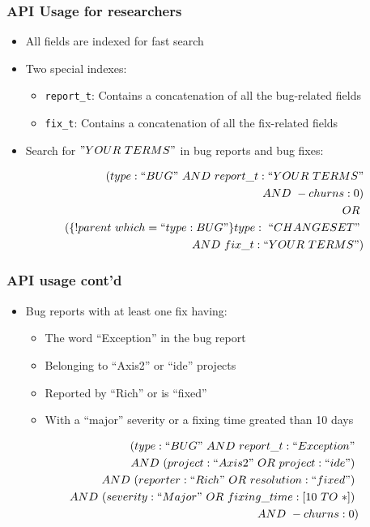 \documentclass{beamer}
\begin{document}
\begin{frame}

  \frametitle{API Usage for researchers}

\begin{itemize}
  \item All fields are indexed for fast search
  \item Two special indexes:
  \begin{itemize}
    \item \texttt{report\_t}: Contains a concatenation of all the bug-related fields
    \item \texttt{fix\_t}: Contains a concatenation of all the fix-related fields
  \end{itemize}
  \item Search for $"YOUR~TERMS"$ in bug reports and bug fixes:
\end{itemize}

  \begin{equation*}
  \begin{split}
  ~~(type:``BUG"~AND~report\_t:``YOUR~TERMS"\\AND~-churns:0)\\
  ~~OR~\\
  ~~(\{!parent~which=``type:BUG"\}type:~``CHANGESET"~\\AND~fix\_t:``YOUR~TERMS")
  \end{split}
  \end{equation*}

\end{frame}

\begin{frame}

  \frametitle{API usage cont'd}

\begin{itemize}
  \item Bug reports with at least one fix having:
  \begin{itemize}
    \item The word ``Exception'' in the bug report
    \item Belonging to ``Axis2'' or ``ide'' projects
    \item Reported by ``Rich'' or is ``fixed''
    \item With a ``major'' severity or a fixing time greated than 10 days
  \end{itemize}
\end{itemize}

  \begin{equation*}
  \begin{split}
    (type:``BUG"~AND~report\_t:``Exception"~\\
  ~~AND~(project:``Axis2"~OR~project:``ide")~\\
  ~~AND~(reporter:``Rich"~OR~resolution:``fixed")~\\
  ~~AND~(severity:``Major"~OR~fixing\_time:[10~TO~*])~\\
  ~~AND~-churns:0)
  \end{split}
  \end{equation*}


\end{frame}
\end{document}
